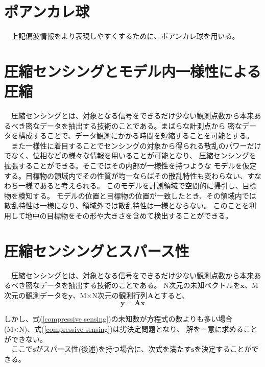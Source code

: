 \documentclass[12pt,a4paper]{jsreport}
\begin{document}
\section{ポアンカレ球}    
　上記偏波情報をより表現しやすくするために、ポアンカレ球を用いる。

      


\section{圧縮センシングとモデル内一様性による圧縮}
　圧縮センシングとは、対象となる信号をできるだけ少ない観測点数から本来あるべき密なデータを抽出する技術のことである。まばらな計測点から
密なデータを構成することで、データ観測にかかる時間を短縮することを可能とする。
\\　また一様性に着目することでセンシングの対象から得られる散乱のパワーだけでなく、位相などの様々な情報を用いることが可能となり、
圧縮センシングを拡張することができる\cite{imai}。そこではその内部が一様性を持つような
モデルを仮定する。目標物の領域内でその性質が均一ならばその散乱特性も変わらない、すなわち一様であると考えられる。
このモデルを計測領域で空間的に掃引し、目標物を検知する。
モデルの位置と目標物の位置が一致したとき、その領域内では散乱特性は一様になり、領域外では散乱特性は一様とならない。
このことを利用して地中の目標物をその形や大きさを含めて検出することができる。

\section{圧縮センシングとスパース性}
　圧縮センシングとは、対象となる信号をできるだけ少ない観測点数から本来あるべき密なデータを抽出する技術のことである。
N次元の未知ベクトルを$\bm{x}$、M次元の観測データを$\bm{y}$、M$\times$N次元の観測行列$\bm{A}$とすると、
\begin{equation}
  \bm{y} =
  \bm{A}\bm{x}
      \label{compressive sensing}
  \end{equation}

しかし、式(\ref{compressive sensing})の未知数が方程式の数よりも多い場合(M<N)、式(\ref{compressive sensing})は劣決定問題となり、
解を一意に求めることができない\cite{CSAKita}。
\\　ここで$\bm{s}$がスパース性(後述)を持つ場合に、次式を満たす$\bm{s}$を決定することができる。
\end{document}
